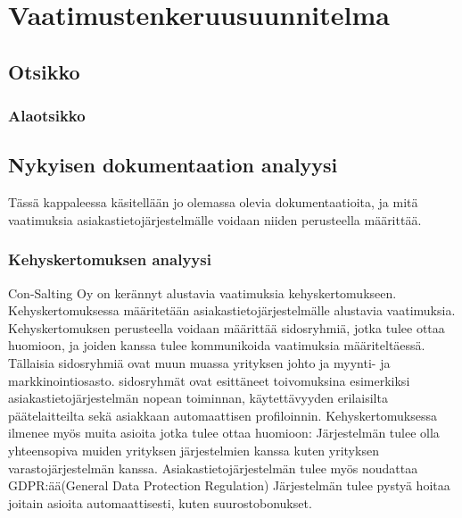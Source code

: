 \chapter{Vaatimustenkeruusuunnitelma} %
\label{keruu} %
\thispagestyle{fancy} %

\lipsum[1]

\section{Otsikko}  %

\lipsum

\subsection{Alaotsikko}

\lipsum[1-3]


\section{Nykyisen dokumentaation analyysi}
Tässä kappaleessa käsitellään jo olemassa olevia dokumentaatioita, ja mitä vaatimuksia asiakastietojärjestelmälle voidaan niiden perusteella määrittää.



\subsection{Kehyskertomuksen analyysi}
Con-Salting Oy on kerännyt alustavia vaatimuksia kehyskertomukseen. Kehyskertomuksessa määritetään asiakastietojärjestelmälle alustavia vaatimuksia.
Kehyskertomuksen perusteella voidaan määrittää sidosryhmiä, jotka tulee ottaa huomioon, ja joiden kanssa tulee kommunikoida vaatimuksia määriteltäessä.
Tällaisia sidosryhmiä ovat muun muassa yrityksen johto ja myynti- ja markkinointiosasto.
sidosryhmät ovat esittäneet toivomuksina esimerkiksi asiakastietojärjestelmän nopean toiminnan, käytettävyyden erilaisilta päätelaitteilta sekä asiakkaan 
automaattisen profiloinnin. 
    Kehyskertomuksessa ilmenee myös muita asioita jotka tulee ottaa huomioon:
Järjestelmän tulee olla yhteensopiva muiden yrityksen järjestelmien kanssa kuten yrityksen varastojärjestelmän kanssa.
Asiakastietojärjestelmän tulee myös noudattaa GDPR:ää(General Data Protection Regulation)
Järjestelmän tulee pystyä hoitaa joitain asioita automaattisesti, kuten suurostobonukset.

